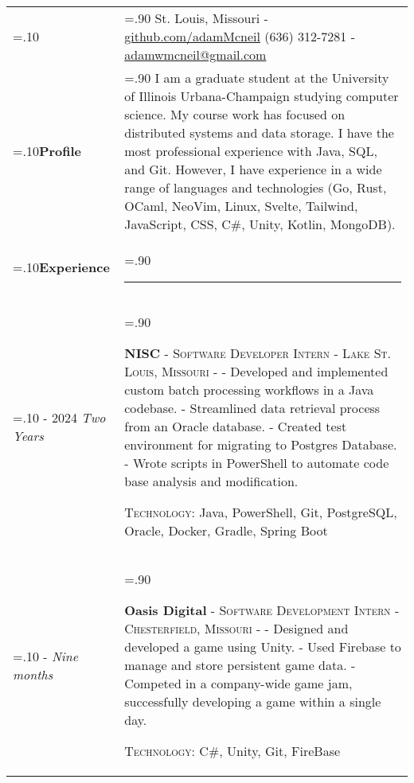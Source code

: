 \documentclass[10pt]{article}
\newcommand{\timeFrame}[3] {
  \if\relax\detokenize{#2}\relax
    #1
  \else
    #1 - #2
  \fi
  \newline
  \scriptsize \textit{#3}
}
\newcommand{\entry}[6] {
  \textbf{#1}
  \if\relax\detokenize{#2}\relax
  \else
       - \textsc{#2}
  \fi
  \if\relax\detokenize{#3}\relax
  \else
      - \textsc{#3}
  \fi
  \if\relax\detokenize{#4}\relax
  \else
      - \href{https://#4}{#4}
  \fi
  \newline #5
  \if\relax\detokenize{#6}\relax
  \else
      \newline \textsc{Technology:} #6
  \fi
  \\
}
\newcommand{\horizontalLine}[0] {
    \noindent\rule{.90\linewidth}{0.4pt}
}
\begin{document}

\begin{tabularx}{\linewidth}{>{\hsize=.10\hsize}X>{\hsize=.90\hsize}X}

{\bfseries\large Adam McNeil} &
St. Louis, Missouri - \href{https://github.com/adamMcneil}{github.com/adamMcneil}\newline
{(636) 312-7281 \hspace{5.5mm} - \href{mailto:adamwmcneil@gmail.com}{adamwmcneil@gmail.com}} \\[5pt]

\textbf{Profile} &
{
  I am a graduate student at the University of Illinois Urbana-Champaign studying computer science.
  My course work has focused on distributed systems and data storage.
  I have the most professional experience with Java, SQL, and Git.
  However, I have experience in a wide range of languages and technologies (Go, Rust, OCaml, NeoVim, Linux, Svelte, Tailwind, JavaScript, CSS, C\#, Unity, Kotlin, MongoDB).
 \newline
} \\

\textbf{Experience} & \horizontalLine \\

\timeFrame{2023}{2024}{Two Years} &
\entry{NISC}
  {Software Developer Intern}
  {Lake St. Louis, Missouri}
  {}
  {
  - Developed and implemented custom batch processing workflows in a Java codebase. \newline
  - Streamlined data retrieval process from an Oracle database. \newline
  - Created test environment for migrating to Postgres Database. \newline
  - Wrote scripts in PowerShell to automate code base analysis and modification.
  }
  {Java, PowerShell, Git, PostgreSQL, Oracle, Docker, Gradle, Spring Boot \newline}

\timeFrame{2022}{}{Nine months} &
\entry{Oasis Digital}
  {Software Development Intern}
  {Chesterfield, Missouri}
  {}
  {
  - Designed and developed a game using Unity. \newline
  - Used Firebase to manage and store persistent game data. \newline
  - Competed in a company-wide game jam, successfully developing a game within a single day.
  }
  {C\#, Unity, Git, FireBase \newline}



\end{tabularx}
\end{document}
